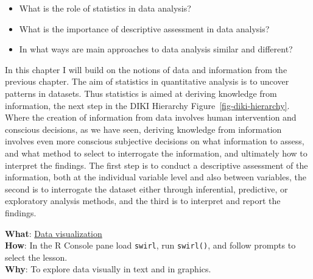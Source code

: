\documentclass[
  letterpaper,
]{latex/krantz}
\providecommand{\tightlist}{%
  \setlength{\itemsep}{0pt}\setlength{\parskip}{0pt}}\usepackage{longtable,booktabs,array}
\begin{document}
\begin{tcolorbox}[enhanced jigsaw, toprule=.15mm, bottomtitle=1mm, coltitle=black, title=\textcolor{quarto-callout-note-color}{\faInfo}\hspace{0.5em}{Keys}, left=2mm, colframe=quarto-callout-note-color-frame, bottomrule=.15mm, colbacktitle=quarto-callout-note-color!10!white, leftrule=.75mm, colback=white, titlerule=0mm, breakable, toptitle=1mm, opacityback=0, arc=.35mm, rightrule=.15mm, opacitybacktitle=0.6]

\begin{itemize}
\tightlist
\item
  What is the role of statistics in data analysis?
\item
  What is the importance of descriptive assessment in data analysis?
\item
  In what ways are main approaches to data analysis similar and
  different?
\end{itemize}

\end{tcolorbox}

In this chapter I will build on the notions of data and information from
the previous chapter. The aim of statistics in quantitative analysis is
to uncover patterns in datasets. Thus statistics is aimed at deriving
knowledge from information, the next step in the DIKI Hierarchy
Figure~\ref{fig-diki-hierarchy}. Where the creation of information from
data involves human intervention and conscious decisions, as we have
seen, deriving knowledge from information involves even more conscious
subjective decisions on what information to assess, and what method to
select to interrogate the information, and ultimately how to interpret
the findings. The first step is to conduct a descriptive assessment of
the information, both at the individual variable level and also between
variables, the second is to interrogate the dataset either through
inferential, predictive, or exploratory analysis methods, and the third
is to interpret and report the findings.

\begin{tcolorbox}[enhanced jigsaw, toprule=.15mm, bottomtitle=1mm, coltitle=black, title=\textcolor{quarto-callout-tip-color}{\faLightbulb}\hspace{0.5em}{Interactive programming}, left=2mm, colframe=quarto-callout-tip-color-frame, bottomrule=.15mm, colbacktitle=quarto-callout-tip-color!10!white, leftrule=.75mm, colback=white, titlerule=0mm, breakable, toptitle=1mm, opacityback=0, arc=.35mm, rightrule=.15mm, opacitybacktitle=0.6]

\textbf{What}: \href{https://github.com/lin380/swirl}{Data
visualization}\\
\textbf{How}: In the R Console pane load \texttt{swirl}, run
\texttt{swirl()}, and follow prompts to select the lesson.\\
\textbf{Why}: To explore data visually in text and in graphics.

\end{tcolorbox}
\end{document}
